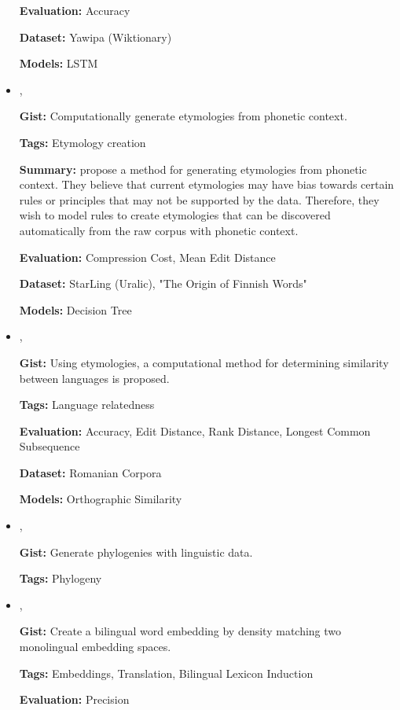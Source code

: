 \documentclass{article}[a4paper]
\newcommand{\bitem}[2]{
    \item[\cite{#1}]
        \textbf{\citetitle{#1}}
        
        \citeauthor{#1}, \citeyear{#1}
        \newline\newline
        {#2}
}%
\begin{document}
\begin{itemize}
{        \textbf{Evaluation:}
        Accuracy

        \textbf{Dataset:}
        Yawipa (Wiktionary)

        \textbf{Models:}
        LSTM
    }%

    \bitem{wettig_using_2012}%
    {%
        \textbf{Gist:}
        Computationally generate etymologies from phonetic context.

        \textbf{Tags:}
        Etymology creation

        \textbf{Summary:}
        \citeauthor{wettig_using_2012} propose a method for generating
        etymologies from phonetic context. They believe that current etymologies
        may have bias towards certain rules or principles that may not be
        supported by the data. Therefore, they wish to model rules to create
        etymologies that can be discovered automatically from the raw corpus
        with phonetic context.

        \textbf{Evaluation:}
        Compression Cost, Mean Edit Distance

        \textbf{Dataset:}
        StarLing (Uralic), "The Origin of Finnish Words"

        \textbf{Models:}
        Decision Tree
    }%

    \bitem{ciobanu_etymological_2014}%
    {%
        \textbf{Gist:}
        Using etymologies, a computational method for determining similarity
        between languages is proposed.

        \textbf{Tags:}
        Language relatedness

        \textbf{Evaluation:}
        Accuracy, Edit Distance, Rank Distance, Longest Common Subsequence

        \textbf{Dataset:}
        Romanian Corpora

        \textbf{Models:}
        Orthographic Similarity
    }%

    \bitem{nouri_alignment_2016}%
    {%
        \textbf{Gist:}
        Generate phylogenies with linguistic data.

        \textbf{Tags:}
        Phylogeny
    }%

    \bitem{zhou_density_2019}%
    {%
        \textbf{Gist:}
        Create a bilingual word embedding by density matching two monolingual
        embedding spaces.

        \textbf{Tags:}
        Embeddings, Translation, Bilingual Lexicon Induction

        \textbf{Evaluation:}
        Precision

}
\end{itemize}
\end{document}
